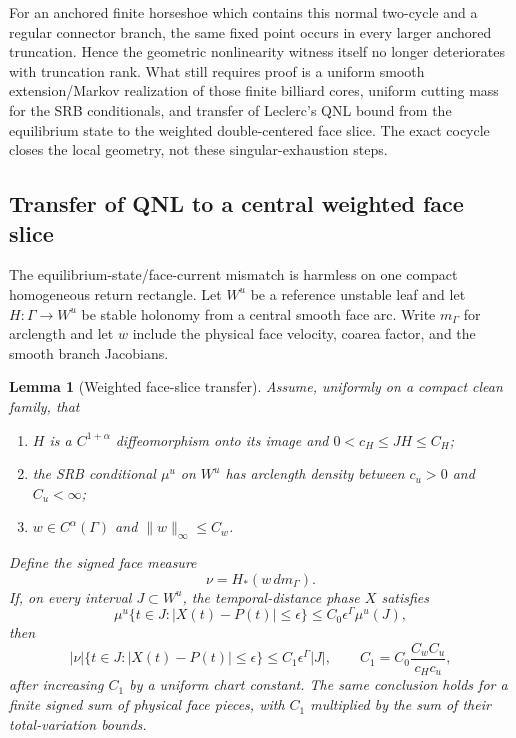 \documentclass[11pt]{article}
\newtheorem{lemma}[theorem]{Lemma}
\begin{document}
For an anchored finite horseshoe which contains this normal two-cycle and a
regular connector branch, the same fixed point occurs in every larger
anchored truncation.  Hence the geometric nonlinearity witness itself no
longer deteriorates with truncation rank.  What still requires proof is a
uniform smooth extension/Markov realization of those finite billiard cores,
uniform cutting mass for the SRB conditionals, and transfer of Leclerc's QNL
bound from the equilibrium state to the weighted double-centered face slice.
The exact cocycle closes the local geometry, not these singular-exhaustion
steps.

\subsection{Transfer of QNL to a central weighted face slice}

The equilibrium-state/face-current mismatch is harmless on one compact
homogeneous return rectangle.  Let $W^u$ be a reference unstable leaf and let
$H:\Gamma\to W^u$ be stable holonomy from a central smooth face arc.  Write
$m_\Gamma$ for arclength and let $w$ include the physical face velocity,
coarea factor, and the smooth branch Jacobians.

\begin{lemma}[Weighted face-slice transfer]
\label{lem:weighted-face-qnl-transfer}
Assume, uniformly on a compact clean family, that
\begin{enumerate}[label=\textup{(\roman*)}]
\item $H$ is a $C^{1+\alpha}$ diffeomorphism onto its image and
      $0<c_H\le JH\le C_H$;
\item the SRB conditional $\mu^u$ on $W^u$ has arclength density between
      $c_u>0$ and $C_u<\infty$;
\item $w\in C^\alpha(\Gamma)$ and $\|w\|_\infty\le C_w$.
\end{enumerate}
Define the signed face measure
\[
 \nu=H_*(w\,dm_\Gamma).
\]
If, on every interval $J\subset W^u$, the temporal-distance phase $X$
satisfies
\[
 \mu^u\{t\in J:|X(t)-P(t)|\le\epsilon\}
 \le C_0\epsilon^\Gamma\mu^u(J),
\]
then
\[
 |\nu|\{t\in J:|X(t)-P(t)|\le\epsilon\}
 \le C_1\epsilon^\Gamma |J|,
 \qquad
 C_1=C_0\frac{C_wC_u}{c_Hc_u},
\]
after increasing $C_1$ by a uniform chart constant.  The same conclusion
holds for a finite signed sum of physical face pieces, with $C_1$ multiplied
by the sum of their total-variation bounds.
\end{lemma}
\end{document}
